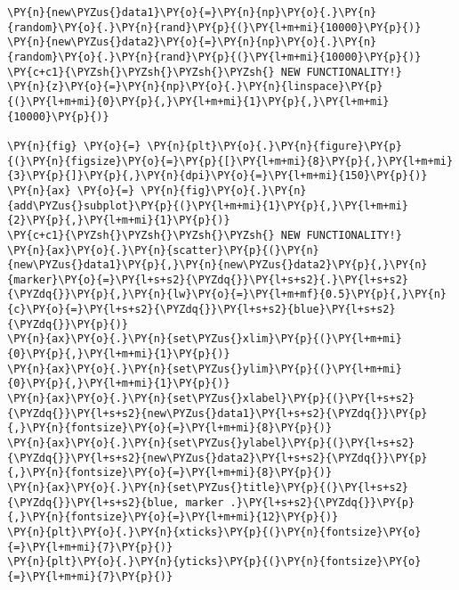     \begin{tcolorbox}[breakable, size=fbox, boxrule=1pt, pad at break*=1mm,colback=cellbackground, colframe=cellborder]
\begin{Verbatim}[commandchars=\\\{\}]
\PY{n}{new\PYZus{}data1}\PY{o}{=}\PY{n}{np}\PY{o}{.}\PY{n}{random}\PY{o}{.}\PY{n}{rand}\PY{p}{(}\PY{l+m+mi}{10000}\PY{p}{)}
\PY{n}{new\PYZus{}data2}\PY{o}{=}\PY{n}{np}\PY{o}{.}\PY{n}{random}\PY{o}{.}\PY{n}{rand}\PY{p}{(}\PY{l+m+mi}{10000}\PY{p}{)}
\PY{c+c1}{\PYZsh{}\PYZsh{}\PYZsh{}\PYZsh{} NEW FUNCTIONALITY!}
\PY{n}{z}\PY{o}{=}\PY{n}{np}\PY{o}{.}\PY{n}{linspace}\PY{p}{(}\PY{l+m+mi}{0}\PY{p}{,}\PY{l+m+mi}{1}\PY{p}{,}\PY{l+m+mi}{10000}\PY{p}{)}

\PY{n}{fig} \PY{o}{=} \PY{n}{plt}\PY{o}{.}\PY{n}{figure}\PY{p}{(}\PY{n}{figsize}\PY{o}{=}\PY{p}{[}\PY{l+m+mi}{8}\PY{p}{,}\PY{l+m+mi}{3}\PY{p}{]}\PY{p}{,}\PY{n}{dpi}\PY{o}{=}\PY{l+m+mi}{150}\PY{p}{)} 
\PY{n}{ax} \PY{o}{=} \PY{n}{fig}\PY{o}{.}\PY{n}{add\PYZus{}subplot}\PY{p}{(}\PY{l+m+mi}{1}\PY{p}{,}\PY{l+m+mi}{2}\PY{p}{,}\PY{l+m+mi}{1}\PY{p}{)}
\PY{c+c1}{\PYZsh{}\PYZsh{}\PYZsh{}\PYZsh{} NEW FUNCTIONALITY!}
\PY{n}{ax}\PY{o}{.}\PY{n}{scatter}\PY{p}{(}\PY{n}{new\PYZus{}data1}\PY{p}{,}\PY{n}{new\PYZus{}data2}\PY{p}{,}\PY{n}{marker}\PY{o}{=}\PY{l+s+s2}{\PYZdq{}}\PY{l+s+s2}{.}\PY{l+s+s2}{\PYZdq{}}\PY{p}{,}\PY{n}{lw}\PY{o}{=}\PY{l+m+mf}{0.5}\PY{p}{,}\PY{n}{c}\PY{o}{=}\PY{l+s+s2}{\PYZdq{}}\PY{l+s+s2}{blue}\PY{l+s+s2}{\PYZdq{}}\PY{p}{)}
\PY{n}{ax}\PY{o}{.}\PY{n}{set\PYZus{}xlim}\PY{p}{(}\PY{l+m+mi}{0}\PY{p}{,}\PY{l+m+mi}{1}\PY{p}{)}
\PY{n}{ax}\PY{o}{.}\PY{n}{set\PYZus{}ylim}\PY{p}{(}\PY{l+m+mi}{0}\PY{p}{,}\PY{l+m+mi}{1}\PY{p}{)}
\PY{n}{ax}\PY{o}{.}\PY{n}{set\PYZus{}xlabel}\PY{p}{(}\PY{l+s+s2}{\PYZdq{}}\PY{l+s+s2}{new\PYZus{}data1}\PY{l+s+s2}{\PYZdq{}}\PY{p}{,}\PY{n}{fontsize}\PY{o}{=}\PY{l+m+mi}{8}\PY{p}{)}
\PY{n}{ax}\PY{o}{.}\PY{n}{set\PYZus{}ylabel}\PY{p}{(}\PY{l+s+s2}{\PYZdq{}}\PY{l+s+s2}{new\PYZus{}data2}\PY{l+s+s2}{\PYZdq{}}\PY{p}{,}\PY{n}{fontsize}\PY{o}{=}\PY{l+m+mi}{8}\PY{p}{)}
\PY{n}{ax}\PY{o}{.}\PY{n}{set\PYZus{}title}\PY{p}{(}\PY{l+s+s2}{\PYZdq{}}\PY{l+s+s2}{blue, marker .}\PY{l+s+s2}{\PYZdq{}}\PY{p}{,}\PY{n}{fontsize}\PY{o}{=}\PY{l+m+mi}{12}\PY{p}{)}
\PY{n}{plt}\PY{o}{.}\PY{n}{xticks}\PY{p}{(}\PY{n}{fontsize}\PY{o}{=}\PY{l+m+mi}{7}\PY{p}{)}
\PY{n}{plt}\PY{o}{.}\PY{n}{yticks}\PY{p}{(}\PY{n}{fontsize}\PY{o}{=}\PY{l+m+mi}{7}\PY{p}{)}


\end{Verbatim}
\end{tcolorbox}
